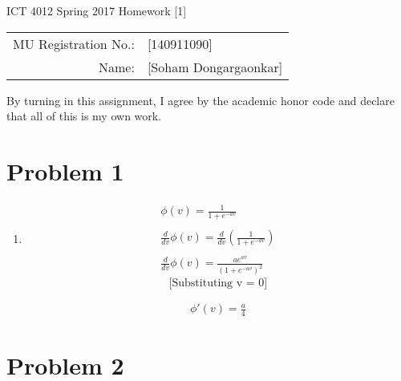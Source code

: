 \documentclass[12pt]{article}
\begin{document}
\begin{center}
{\Large ICT 4012 Spring 2017 Homework [1]} %

\begin{tabular}{rl}
MU Registration No.: & [140911090] \\  %
Name: & [Soham Dongargaonkar] \\   %
\end{tabular}
\end{center}

By turning in this assignment, I agree by the academic honor code and declare that all of this is my own work.

\section*{Problem 1}

\begin{enumerate}
    \item \begin{gather}
                \phi(v) =  \frac{1}{1+e^{-av}} \nonumber\\ \nonumber\\
                \frac{d}{dv}\phi(v) = \frac{d}{dv}(\frac{1}{1+e^{-av}})\nonumber\\\nonumber\\
                \frac{d}{dv}\phi(v) = \frac{ae^{av}}{(1+e^{-av})^2} \label{eqn:1}
            \end{gather}
            \[ 
                \text{[Substituting\ v = 0]} 
            \]
             
            \begin{gather}
                \phi'(v) = \frac{a}{4}
            \end{gather}  
               

   
\end{enumerate}

\section*{Problem 2}
\end{document}
